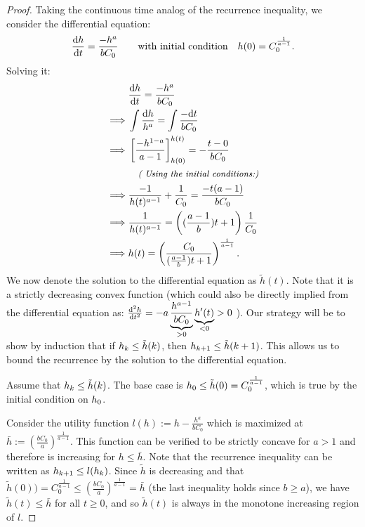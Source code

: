 \begin{proof}
Taking the continuous time analog of the recurrence inequality, we consider
the differential equation:
$$\frac{\mathrm{\bm{d}} h}{\mathrm{\bm{d}} t} = \frac{-h^a}{bC_0} \qquad \text{with initial condition} \quad h(0)=C_0^{\frac{1}{a-1}}.$$
Solving it:
	\begin{equation*}
		\begin{split}
		&\frac{\mathrm{\bm{d}} h}{\mathrm{\bm{d}} t} = \frac{-h^a}{b C_0}\\
		\implies &\int \frac{\mathrm{\bm{d}} h}{h^a} = \int \frac{-\mathrm{\bm{d}} t}{b C_0}\\
		\implies &\left[\frac{-h^{1-a}}{a-1}\right]^{h(t)}_{h(0)} = -\frac{t-0}{b C_0}\\
		&\quad\emph{\small{( Using the initial conditions:)}}\\
		\implies &\frac{-1}{h(t)^{a-1}} + \frac{1}{C_0} = \frac{-t(a-1)}{b C_0}\\
		\implies &\frac{1}{h(t)^{a-1}} = \left( (\frac{a-1}{b}) t + 1\right)\frac{1}{C_0}\\
		\implies &h(t) = \left(\frac{C_0}{ (\frac{a-1}{b}) t +1}\right)^{\frac{1}{a-1}}.
		\end{split}
	\end{equation*}
We now denote the solution to the differential equation as $\tilde{h}(t)$. Note that it is a strictly decreasing convex function 
(which could also be directly implied from the differential equation as: 
$\frac{\mathrm{\bm{d}}^2 h}{\mathrm{\bm{d}} t^2} = -a\underbrace{\frac{h^{a-1}}{b C_0}}_{>0} \underbrace{h'(t)}_{<0}>0$ ).
Our strategy will be to show by induction that if $h_k\leq \tilde{h}(k)$, then $h_{k+1}\leq \tilde{h}(k+1)$. This allows us to bound the recurrence by the solution to the differential equation. 

Assume that $h_k\leq \tilde{h}(k)$. The base case is $h_0\leq\tilde{h}(0)= C_0^{\frac{1}{a-1}}$, which is true by the initial condition on $h_0$.

Consider the utility function $l(h) := h-\frac{h^a}{b C_0}$ which is maximized at $\bar{h} := \left(\frac{b C_0}{a}\right)^{\frac{1}{a-1}}$. This function can be verified to be strictly concave for $a > 1$ and therefore is increasing for $h\leq \bar{h}$. Note that the recurrence inequality can be written as $h_{k+1} \leq l(h_k)$.
Since $\tilde{h}$ is decreasing and that $\tilde{h}(0)) = C_0^{\frac{1}{a-1}} \leq \left(\frac{bC_0}{a}\right)^{\frac{1}{a-1}} = \bar{h}$ (the last inequality holds since $b\geq a$), we have $\tilde{h}(t) \leq \bar{h}$ for all $t \geq 0$, and so $\tilde{h}(t)$ is always in the monotone increasing region of $l$. 


\end{proof}
